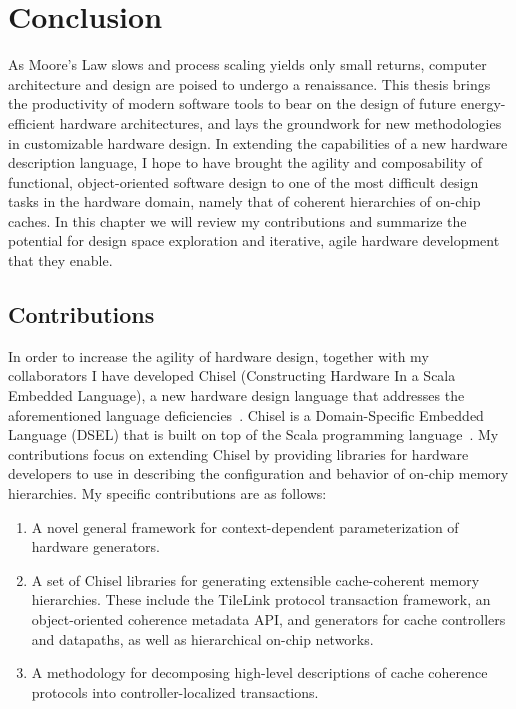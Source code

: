 \chapter{Conclusion}
\label{c.conclusion}

As Moore's Law slows and process scaling yields only small returns,
computer architecture and design are poised to undergo a renaissance.
This thesis brings the productivity of modern software tools to bear
on the design of future energy-efficient hardware architectures,
and lays the groundwork for new methodologies in customizable hardware design.
In extending the capabilities of a new hardware description language, I hope to have brought the agility and composability of functional, object-oriented software design to one of the most difficult design tasks in the hardware domain,
namely that of coherent hierarchies of on-chip caches.
In this chapter we will review my contributions and summarize the potential for design space exploration
and iterative, agile hardware development that they enable.

\section{Contributions}

In order to increase the agility of hardware design,
together with my collaborators I have developed Chisel (Constructing Hardware In a Scala Embedded Language), a new hardware design language that addresses the aforementioned language deficiencies~\cite{chisel}.
Chisel is a Domain-Specific Embedded Language (DSEL) that is built on top of the Scala programming language~\cite{scala}.
My contributions focus on extending Chisel by providing libraries for hardware developers to use in describing the configuration and behavior of on-chip memory hierarchies.
My specific contributions are as follows:

\begin{enumerate}
\item A novel general framework for context-dependent parameterization of hardware generators.
\item A set of Chisel libraries for generating extensible cache-coherent memory hierarchies.
These include the TileLink protocol transaction framework, an object-oriented coherence metadata API,
and generators for cache controllers and datapaths, as well as hierarchical on-chip networks.
\item A methodology for decomposing high-level descriptions of cache coherence protocols into controller-localized transactions.
\end{enumerate}

